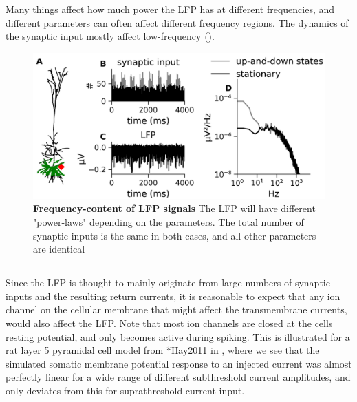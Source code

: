 Many things affect how much power the LFP has at different frequencies, and different parameters can often affect different frequency regions. The dynamics of the synaptic input mostly affect low-frequency ().
\begin{figure}[!ht]
\begin{center}
\includegraphics[width=.7\textwidth]{Figures/LFP/fig_LFP_powerlaws_input_dynamics.png}
\end{center}
\caption{\textbf{Frequency-content of LFP signals}
The LFP will have different "power-laws" depending on the parameters. The total number of synaptic inputs is the same in both cases, and all other parameters are identical
}
\label{fig:LFP:psd_input}
\end{figure}

\subsection{}

Since the LFP is thought to mainly originate from large numbers of synaptic inputs and the resulting return currents, it is reasonable to expect that any ion channel on the cellular membrane that might affect the transmembrane currents, would also affect the LFP. Note that most ion channels are closed at the cells resting potential, and only becomes active during spiking. This is illustrated for a rat layer 5 pyramidal cell model from  \citeasnoun**{Hay2011} in ,
where we see that the simulated somatic membrane potential response to an injected current was almost perfectly linear for a wide range of different subthreshold current amplitudes, and only deviates from this for suprathreshold current input. 

